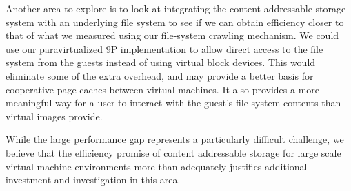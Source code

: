 Another area to explore is to look at integrating the content addressable
storage system with an underlying file system to see if we can obtain 
efficiency closer to that of what we measured using our file-system crawling
mechanism.
We could use our paravirtualized 9P implementation to allow direct access
to the file system from the guests instead of using virtual block devices.
This would eliminate some of the extra overhead, and may provide a better
basis for cooperative page caches between virtual machines.
It also provides a more meaningful way for a user to interact with the 
guest's file system contents than virtual images provide.

While the large performance gap represents a particularly difficult challenge, 
we believe that the efficiency promise of content addressable storage for 
large scale virtual machine environments more than adequately justifies 
additional investment and investigation in this area.
